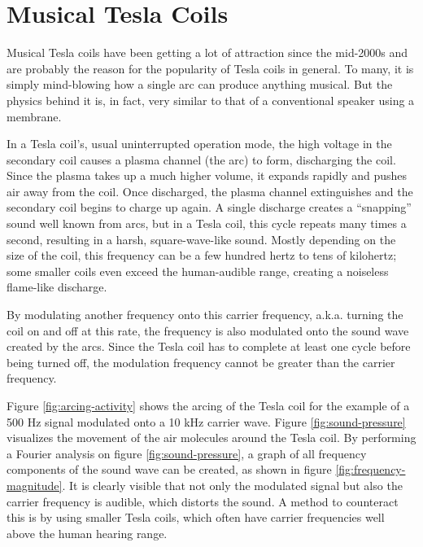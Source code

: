
\section{Musical Tesla Coils}
\label{sec:musical-tesla-coils}

Musical Tesla coils have been getting a lot of attraction since the mid-2000s and are probably the reason for the popularity of Tesla coils in general. To many, it is simply mind-blowing how a single arc can produce anything musical. But the physics behind it is, in fact, very similar to that of a conventional speaker using a membrane.

In a Tesla coil's, usual uninterrupted operation mode, the high voltage in the secondary coil causes a plasma channel (the arc) to form, discharging the coil. Since the plasma takes up a much higher volume, it expands rapidly and pushes air away from the coil. Once discharged, the plasma channel extinguishes and the secondary coil begins to charge up again. A single discharge creates a \enquote{snapping} sound well known from arcs, but in a Tesla coil, this cycle repeats many times a second, resulting in a harsh, square-wave-like sound. Mostly depending on the size of the coil, this frequency can be a few hundred hertz to tens of kilohertz; some smaller coils even exceed the human-audible range, creating a noiseless flame-like discharge.

By modulating another frequency onto this carrier frequency, a.k.a. turning the coil on and off at this rate, the frequency is also modulated onto the sound wave created by the arcs. Since the Tesla coil has to complete at least one cycle before being turned off, the modulation frequency cannot be greater than the carrier frequency. 

Figure \ref{fig:arcing-activity} shows the arcing of the Tesla coil for the example of a 500 Hz signal modulated onto a 10 kHz carrier wave. Figure \ref{fig:sound-pressure} visualizes the movement of the air molecules around the Tesla coil. By performing a Fourier analysis on figure \ref{fig:sound-pressure}, a graph of all frequency components of the sound wave can be created, as shown in figure \ref{fig:frequency-magnitude}. It is clearly visible that not only the modulated signal but also the carrier frequency is audible, which distorts the sound. A method to counteract this is by using smaller Tesla coils, which often have carrier frequencies well above the human hearing range.

